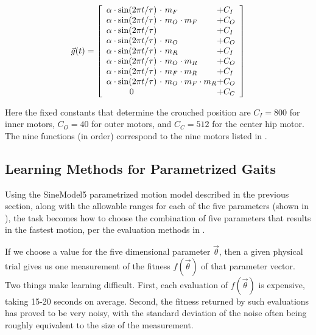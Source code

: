 \[
\vec{g}(t) =
\left[ {\begin{array}{c@{ }l@{ }l}
\amp \cdot \sin(2\pi t / \tau) & \ \cdot \           m_F            & + C_I \\ %
\amp \cdot \sin(2\pi t / \tau) & \ \cdot \ m_O \cdot m_F            & + C_O \\ %
\amp \cdot \sin(2\pi t / \tau) & \                                  & + C_I \\ %
\amp \cdot \sin(2\pi t / \tau) & \ \cdot \ m_O                      & + C_O \\ %
\amp \cdot \sin(2\pi t / \tau) & \ \cdot \                     m_R  & + C_I \\ %
\amp \cdot \sin(2\pi t / \tau) & \ \cdot \ m_O           \cdot m_R  & + C_O \\ %
\amp \cdot \sin(2\pi t / \tau) & \ \cdot \           m_F \cdot m_R  & + C_I \\ %
\amp \cdot \sin(2\pi t / \tau) & \ \cdot \ m_O \cdot m_F \cdot m_R  & + C_O \\ %
0                              & \                                  & + C_C \\ %
\end{array} } \right]
\]

\noindent Here the fixed constants that determine the crouched
position are $C_I = 800$ for inner motors, $C_O = 40$ for outer
motors, and $C_C = 512$ for the center hip motor.  The nine functions (in order)
correspond to the nine motors listed in
.



\subsection{Learning Methods for Parametrized Gaits}

Using the SineModel5 parametrized motion model described in the
previous section, along with the allowable ranges for each of the five
parameters (shown in ), the task becomes how to
choose the combination of five parameters that results in the fastest
motion, per the evaluation methods in .

If we choose a value for the five dimensional parameter
$\vec{\theta}$, then a given physical trial gives us one measurement
of the fitness $f(\vec{\theta})$ of that parameter vector.  Two
things make learning difficult.  First, each evaluation of
$f(\vec{\theta})$ is expensive, taking 15-20 seconds on
average.  Second, the fitness returned by such evaluations has proved
to be very noisy, with the standard deviation of the noise often being
roughly equivalent to the size of the measurement.

